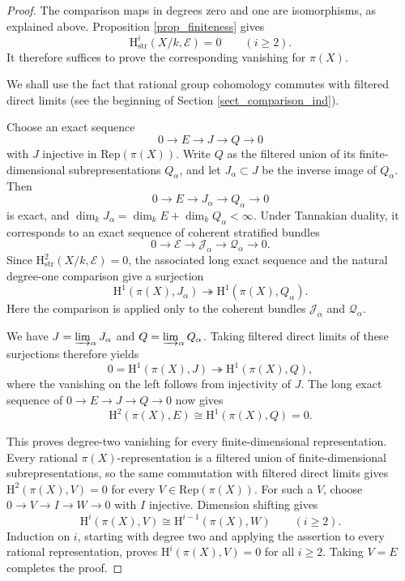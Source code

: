\documentclass[12pt,a4]{amsart}
\theoremstyle{definition}
\begin{document}
\begin{proof}
The comparison maps in degrees zero and one are isomorphisms, as explained above. Proposition \ref{prop_finiteness} gives
\[
\mathrm H^i_{\mathrm{str}}(X/k,\mathcal E)=0\qquad(i\geq 2).
\]
It therefore suffices to prove the corresponding vanishing for $\pi(X)$.

We shall use the fact that rational group cohomology commutes with filtered direct limits (see the beginning of Section \ref{sect_comparison_ind}).

Choose an exact sequence
\[
0\longrightarrow E\longrightarrow J\longrightarrow Q\longrightarrow 0
\]
with $J$ injective in $\mathrm{Rep}(\pi(X))$. Write $Q$ as the filtered union of its finite-dimensional subrepresentations $Q_\alpha$, and let $J_\alpha\subset J$ be the inverse image of $Q_\alpha$. Then
\[
0\longrightarrow E\longrightarrow J_\alpha\longrightarrow Q_\alpha\longrightarrow 0
\]
is exact, and $\dim_k J_\alpha=\dim_k E+\dim_k Q_\alpha<\infty$.
Under Tannakian duality, it corresponds to an exact sequence of coherent stratified bundles
\[
0\longrightarrow\mathcal E\longrightarrow\mathcal J_\alpha
\longrightarrow\mathcal Q_\alpha\longrightarrow 0.
\]
Since $\mathrm H^2_{\mathrm{str}}(X/k,\mathcal E)=0$, the associated long exact sequence and the natural degree-one comparison give a surjection
\[
\mathrm H^1(\pi(X),J_\alpha)\twoheadrightarrow\mathrm H^1(\pi(X),Q_\alpha).
\]
Here the comparison is applied only to the coherent bundles $\mathcal J_\alpha$ and $\mathcal Q_\alpha$.

We have $J=\varinjlim_\alpha J_\alpha$ and $Q=\varinjlim_\alpha Q_\alpha$. Taking filtered direct limits of these surjections therefore yields
\[
0=\mathrm H^1(\pi(X),J)\twoheadrightarrow\mathrm H^1(\pi(X),Q),
\]
where the vanishing on the left follows from injectivity of $J$.
The long exact sequence of $0\to E\to J\to Q\to0$ now gives
\[
\mathrm H^2(\pi(X),E)\cong\mathrm H^1(\pi(X),Q)=0.
\]

This proves degree-two vanishing for every finite-dimensional representation. Every rational $\pi(X)$-representation is a filtered union of finite-dimensional subrepresentations, so the same commutation with filtered direct limits gives $\mathrm H^2(\pi(X),V)=0$ for every $V\in\mathrm{Rep}(\pi(X))$.
For such a $V$, choose $0\to V\to I\to W\to0$ with $I$ injective. Dimension shifting gives
\[
\mathrm H^i(\pi(X),V)\cong\mathrm H^{i-1}(\pi(X),W)\qquad(i\geq 2).
\]
Induction on $i$, starting with degree two and applying the assertion to every rational representation, proves $\mathrm H^i(\pi(X),V)=0$ for all $i\geq 2$. Taking $V=E$ completes the proof.
\end{proof}
\end{document}
